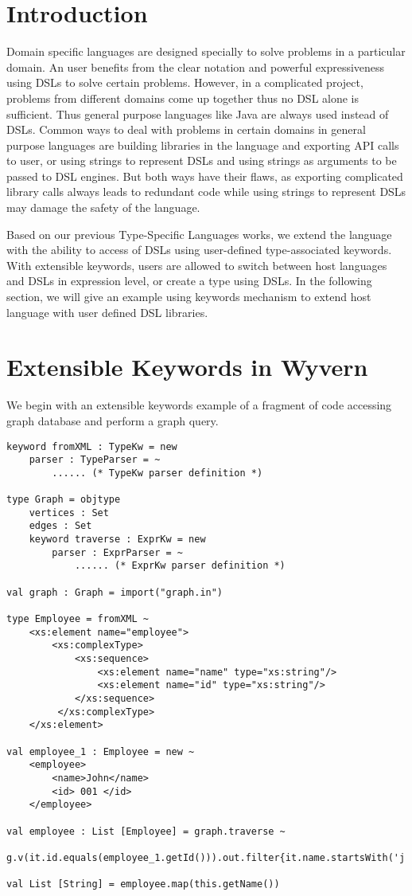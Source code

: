 \documentclass[letterpaper, notitlepage]{article}
\begin{document}
\section{Introduction}
Domain specific languages are designed specially to solve problems in a particular domain. An user benefits from the clear notation and powerful expressiveness using DSLs to solve certain problems. However, in a complicated project, problems from different domains come up together thus no DSL alone is sufficient. Thus general purpose languages like Java are always used instead of DSLs. Common ways to deal with problems in certain domains in general purpose languages are building libraries in the language and exporting API calls to user, or using strings to represent DSLs and using strings as arguments to be passed to DSL engines. But both ways have their flaws, as exporting complicated library calls always leads to redundant code while using strings to represent DSLs may damage the safety of the language.
\par
Based on our previous Type-Specific Languages works, we extend the language with the ability to access of DSLs using user-defined type-associated keywords. With extensible keywords, users are allowed to switch between host languages and DSLs in expression level, or create a type using DSLs. In the following section, we will give an example using keywords mechanism to extend host language with user defined DSL libraries.

\section{Extensible Keywords in Wyvern}
We begin with an extensible keywords example of a fragment of code accessing graph database and perform a graph query.

\begin{lstlisting}[style=wyvern]
keyword fromXML : TypeKw = new
	parser : TypeParser = ~
		...... (* TypeKw parser definition *)

type Graph = objtype
	vertices : Set
	edges : Set
	keyword traverse : ExprKw = new
		parser : ExprParser = ~
			...... (* ExprKw parser definition *)

val graph : Graph = import("graph.in")

type Employee = fromXML ~
	<xs:element name="employee">
	  	<xs:complexType>
	    	<xs:sequence>
	      		<xs:element name="name" type="xs:string"/>
	      		<xs:element name="id" type="xs:string"/>
	    	</xs:sequence>
	 	 </xs:complexType>
	</xs:element>

val employee_1 : Employee = new ~
  	<employee>
	  	<name>John</name>
	  	<id> 001 </id>
	</employee>

val employee : List [Employee] = graph.traverse ~
	g.v(it.id.equals(employee_1.getId())).out.filter{it.name.startsWith('j')}

val List [String] = employee.map(this.getName())
\end{lstlisting} 
\end{document}

